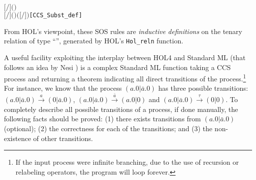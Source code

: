 \begin{alltt}
\ensuremath{[}\ensuremath{/}\ensuremath{]} \ensuremath{(} \ensuremath{)} \HOLSymConst{\HOLTokenDefEquality{}}   \HOLSymConst{\ensuremath{=}}      
\ensuremath{[}\ensuremath{/}\ensuremath{]} \ensuremath{(}  \ensuremath{)} \HOLSymConst{\HOLTokenDefEquality{}}   \HOLSymConst{\ensuremath{=}}         \ensuremath{(}\ensuremath{[}\ensuremath{/}\ensuremath{]} \ensuremath{)}\hfill{[CCS_Subst_def]}
\end{alltt}

From HOL's viewpoint, these
SOS rules are \emph{inductive 
  definitions} on the tenary relation  of type ``'', generated by HOL's 
\texttt{Hol_reln} function.

A useful facility exploiting the interplay
between HOL4 and Standard ML (that follows an idea by Nesi \cite{Nesi:1992ve})
 is a complex Standard ML function
  taking a CCS process and returning a theorem indicating all
  direct transitions of the process.\footnote{If the input process were
 infinite branching, due to the use of recursion or
    relabeling operators, the program will loop forever.}
For instance, we know that the process $(a.0 | \bar{a}.0)$ has three
possible transitions: $(a.0 | \bar{a}.0) \overset{a}{\longrightarrow}
(0 | \bar{a}.0)$, $(a.0 | \bar{a}.0)
\overset{\bar{a}}{\longrightarrow} (a.0 | 0)$ and $(a.0 | \bar{a}.0)
\overset{\tau}{\longrightarrow} (0 | 0)$.
To completely describe all possible transitions of a process, if done manually, the
following facts should be proved: (1) there exists transitions from
$(a.0 | \bar{a}.0)$ (optional); (2) the correctness for each of the
transitions; and (3) the non-existence of other transitions.


